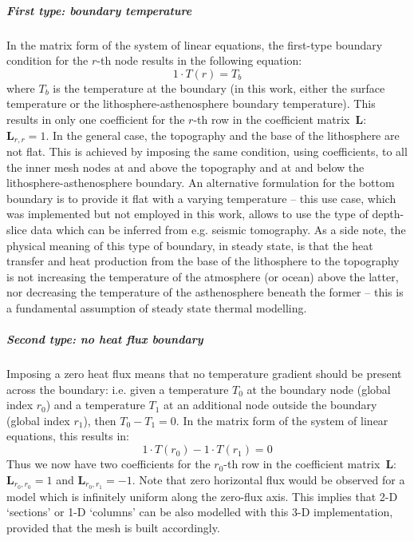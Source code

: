 \subparagraph*{First type: boundary temperature}
In the matrix form of the system of linear equations, the first-type boundary condition for the $r$-th node results in the following equation:
\begin{equation}
    \label{suppl:eq:BoundaryT_NodeEq}
    1 \cdot T(r) = T_b
\end{equation}
where $T_b$ is the temperature at the boundary (in this work, either the surface temperature or the lithosphere-asthenosphere boundary temperature).
This results in only one coefficient for the $r$-th row in the coefficient matrix~$\bm{L}$: $\bm{L}_{r,r} = 1$.
In the general case, the topography and the base of the lithosphere are not flat.
This is achieved by imposing the same condition, using coefficients, to all the inner mesh nodes at and above the topography and at and below the lithosphere-asthenosphere boundary.
An alternative formulation for the bottom boundary is to provide it flat with a varying temperature -- this use case, which was implemented but not employed in this work, allows to use the type of depth-slice data which can be inferred from e.g. seismic tomography.
As a side note, the physical meaning of this type of boundary, in steady state, is that the heat transfer and heat production from the base of the lithosphere to the topography is not increasing the temperature of the atmosphere (or ocean) above the latter, nor decreasing the temperature of the asthenosphere beneath the former -- this is a fundamental assumption of steady state thermal modelling.

\subparagraph*{Second type: no heat flux boundary}
Imposing a zero heat flux means that no temperature gradient should be present across the boundary: i.e. given a temperature $T_0$ at the boundary node (global index $r_0$) and a temperature $T_1$ at an additional node outside the boundary (global index $r_1$), then $T_0 - T_1 = 0$.
In the matrix form of the system of linear equations, this results in:
\begin{equation}
    \label{suppl:eq:BoundaryQ_NodeEq}
    1 \cdot T(r_0) - 1 \cdot T(r_1) = 0
\end{equation}
Thus we now have two coefficients for the $r_0$-th row in the coefficient matrix~$\bm{L}$: $\bm{L}_{r_0,r_0} = 1$ and $\bm{L}_{r_0,r_1} = -1$.
Note that zero horizontal flux would be observed for a model which is infinitely uniform along the zero-flux axis.
This implies that 2-D `sections' or 1-D `columns' can be also modelled with this 3-D implementation, provided that the mesh is built accordingly.

